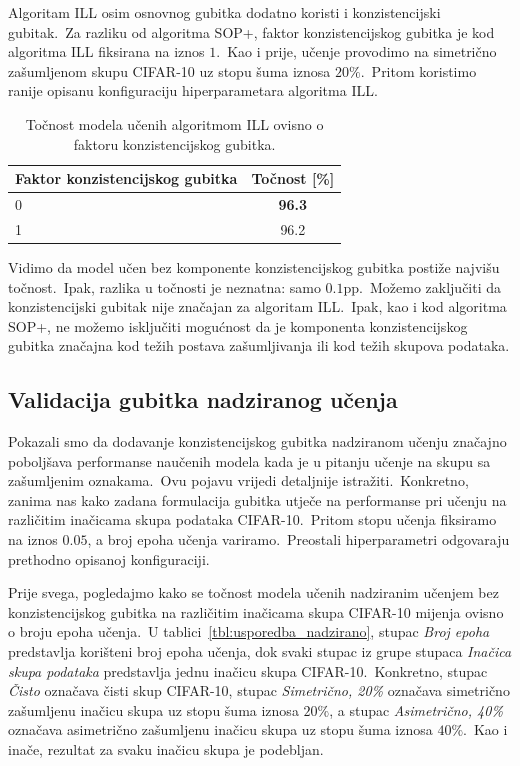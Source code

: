 \documentclass[diplomskirad]{fer}
\begin{document}
Algoritam ILL osim osnovnog gubitka dodatno koristi i konzistencijski gubitak.\ Za razliku od algoritma SOP+, faktor konzistencijskog gubitka je kod algoritma ILL fiksirana na iznos $1$.\ 
Kao i prije, učenje provodimo na simetrično zašumljenom skupu CIFAR-10 uz stopu šuma iznosa $20\%$.\ Pritom koristimo ranije opisanu konfiguraciju hiperparametara algoritma ILL.\ 

\begin{table}[htb]
  \caption{Točnost modela učenih algoritmom ILL ovisno o faktoru konzistencijskog gubitka.}
  \label{tbl:usporedba_ill_gubitak}
  \centering
  \begin{tabular}{l||c}
  Faktor konzistencijskog gubitka & Točnost [\%] \\ \hline \hline
  0 & \textbf{96.3} \\
  1 & 96.2 \\ 
  \end{tabular}
\end{table}

Vidimo da model učen bez komponente konzistencijskog gubitka postiže najvišu točnost.\ Ipak, razlika u točnosti je neznatna: samo $0.1$pp.\ 
Možemo zaključiti da konzistencijski gubitak nije značajan za algoritam ILL.\ Ipak, kao i kod algoritma SOP+, ne možemo isključiti mogućnost da je komponenta konzistencijskog gubitka značajna kod težih postava zašumljivanja ili kod težih skupova podataka.

\subsection{Validacija gubitka nadziranog učenja}
\label{sub:validacija_zasumljene_nadzirano}

Pokazali smo da dodavanje konzistencijskog gubitka nadziranom učenju značajno poboljšava performanse naučenih modela kada je u pitanju učenje na skupu sa zašumljenim oznakama.\ 
Ovu pojavu vrijedi detaljnije istražiti.\ Konkretno, zanima nas kako zadana formulacija gubitka utječe na performanse pri učenju na različitim inačicama skupa podataka CIFAR-10.\ 
Pritom stopu učenja fiksiramo na iznos $0.05$, a broj epoha učenja variramo.\ Preostali hiperparametri odgovaraju prethodno opisanoj konfiguraciji.\ 

Prije svega, pogledajmo kako se točnost modela učenih nadziranim učenjem bez konzistencijskog gubitka na različitim inačicama skupa CIFAR-10 mijenja ovisno o broju epoha učenja.\ 
U tablici~\ref{tbl:usporedba_nadzirano}, stupac \textit{Broj epoha} predstavlja korišteni broj epoha učenja, dok svaki stupac iz grupe stupaca \textit{Inačica skupa podataka} predstavlja jednu inačicu skupa CIFAR-10.\ 
Konkretno, stupac \textit{Čisto} označava čisti skup CIFAR-10, stupac \textit{Simetrično, 20\%} označava simetrično zašumljenu inačicu skupa uz stopu šuma iznosa $20\%$, a stupac \textit{Asimetrično, 40\%} označava asimetrično zašumljenu inačicu skupa uz stopu šuma iznosa $40\%$.\ 
Kao i inače, rezultat za svaku inačicu skupa je podebljan.\ 
\end{document}
